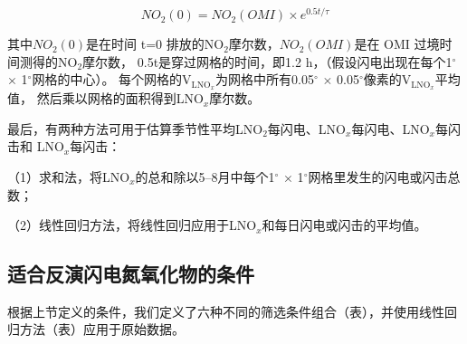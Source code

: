 \begin{equation} \label{eq:inition}
NO_2(0) = NO_2(OMI) \times e^{0.5t/\tau}
\end{equation}

其中$NO_2(0)$是在时间 t=0 排放的NO$_2$摩尔数，$NO_2(OMI)$是在 OMI 过境时间测得的NO$_2$摩尔数，
0.5t是穿过网格的时间，即1.2 h，（假设闪电出现在每个1$^{\circ}$ $\times$ 1$^{\circ}$网格的中心）。
每个网格的V$_\textrm{LNO$_x$}$为网格中所有0.05$^{\circ}$ $\times$ 0.05$^{\circ}$像素的V$_\textrm{LNO$_x$}$平均值，
然后乘以网格的面积得到LNO$_x$摩尔数。

最后，有两种方法可用于估算季节性平均LNO$_2$每闪电、LNO$_x$每闪电、LNO$_x$每闪击和 LNO$_x$每闪击：

（1）求和法，将LNO$_x$的总和除以5--8月中每个1$^{\circ}$ $\times$ 1$^{\circ}$网格里发生的闪电或闪击总数；

（2）线性回归方法，将线性回归应用于LNO$_x$和每日闪电或闪击的平均值。

\subsection{适合反演闪电氮氧化物的条件} \label{subsec:criteria}

根据上节定义的条件，我们定义了六种不同的筛选条件组合（表），并使用线性回归方法（表）应用于原始数据。

